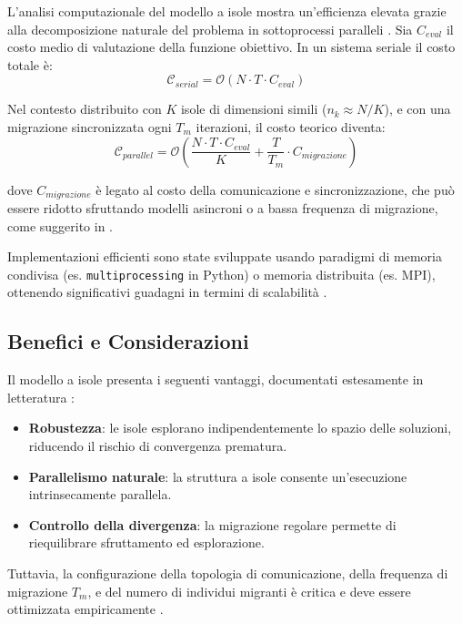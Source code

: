 \documentclass{article}
\begin{document}
L'analisi computazionale del modello a isole mostra un'efficienza elevata grazie alla decomposizione 
naturale del problema in sottoprocessi paralleli \cite{alba2005parallel}. Sia $C_{eval}$ il costo medio 
di valutazione della funzione obiettivo. In un sistema seriale il costo totale è:
\[
\mathcal{C}_{serial} = \mathcal{O}(N \cdot T \cdot C_{eval})
\]

Nel contesto distribuito con $K$ isole di dimensioni simili ($n_k \approx N/K$), e con una migrazione 
sincronizzata ogni $T_m$ iterazioni, il costo teorico diventa:
\[
\mathcal{C}_{parallel} = \mathcal{O}\left(\frac{N \cdot T \cdot C_{eval}}{K} + \frac{T}{T_m} \cdot C_{migrazione}\right)
\]

dove $C_{migrazione}$ è legato al costo della comunicazione e sincronizzazione, che può essere ridotto 
sfruttando modelli asincroni o a bassa frequenza di migrazione, come suggerito in \cite{cantupaz1998survey}.

Implementazioni efficienti sono state sviluppate usando paradigmi di memoria condivisa (es. \texttt{multiprocessing} in Python) o memoria distribuita (es. MPI), ottenendo significativi guadagni in termini di scalabilità \cite{alba2002parallelism, li2019openbox}.

\subsection{Benefici e Considerazioni}

Il modello a isole presenta i seguenti vantaggi, documentati estesamente in letteratura \cite{cantupaz1998survey, tomassini2005spatially}:

\begin{itemize}
    \item \textbf{Robustezza}: le isole esplorano indipendentemente lo spazio delle soluzioni, riducendo il rischio di convergenza prematura.
    \item \textbf{Parallelismo naturale}: la struttura a isole consente un'esecuzione intrinsecamente parallela.
    \item \textbf{Controllo della divergenza}: la migrazione regolare permette di riequilibrare sfruttamento ed esplorazione.
\end{itemize}

Tuttavia, la configurazione della topologia di comunicazione, della frequenza di migrazione $T_m$, e del 
numero di individui migranti è critica e deve essere ottimizzata empiricamente \cite{alba2002parallelism}.
\end{document}
